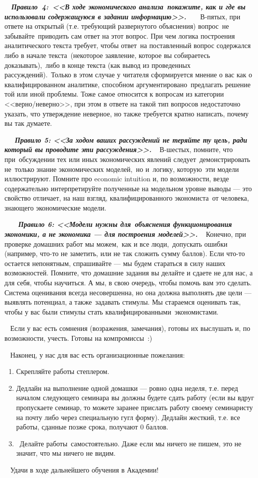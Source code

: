 \documentclass[a4paper,12pt]{article}
\theoremstyle{plain} %
\theoremstyle{definition} %
\theoremstyle{remark} %
\begin{document}
  \textbf{\textit{Правило 4: <<В ходе экономического анализа покажите, как и где вы использовали содержащуюся в задании информацию>>.
}} 
 
 
В-пятых, при ответе на открытый (т.е. требующий развернутого объяснения) вопрос не забывайте приводить сам ответ на этот вопрос. При чем логика построения аналитического текста требует, чтобы ответ на поставленный вопрос содержался либо в начале текста (некоторое заявление, которое вы собираетесь доказывать), либо в конце текста (как вывод из проведенных рассуждений). Только в этом случае у читателя сформируется мнение о вас как о квалифицированном аналитике, способном аргументировано предлагать решение той или иной проблемы. Тоже самое относится к вопросам из категории <<верно/неверно>>, при этом в ответе на такой тип вопросов недостаточно указать, что утверждение неверное, но также требуется кратно написать, почему вы так думаете.

   \textbf{\textit{Правило 5: <<За ходом ваших рассуждений не теряйте ту цель, ради который вы проводите эти рассуждения>>.
}}
 
В-шестых, помните, что при обсуждении тех или иных экономических явлений следует демонстрировать не только знание экономических моделей, но и логику, которую эти модели иллюстрируют. Помните про economic intuition и, по возможности, везде содержательно интерпретируйте полученные на модельном уровне выводы --- это свойство отличает, на наш взгляд, квалифицированного экономиста от человека, знающего экономические модели.   

    \textbf{\textit{Правило 6: <<Модели нужны для объяснения функционирования экономики, а не экономика --- для построения моделей>>. 
}}
 
Конечно, при проверке домашних работ мы можем, как и все люди, допускать ошибки (например, что-то не заметить, или не так сложить сумму баллов). Если что-то остается непонятным, спрашивайте --- мы будем стараться в силу наших возможностей. Помните, что домашние задания вы делайте и сдаете не для нас, а для себя, чтобы научиться. А мы, в свою очередь, чтобы помочь вам это сделать. Система оценивания всегда несовершенна, но она должна выполнять две цели --- выявлять потенциал, а также задавать стимулы. Мы стараемся оценивать так, чтобы у вас были стимулы стать квалифицированными экономистами.

 
Если у вас есть сомнения (возражения, замечания), готовы их выслушать и, по возможности, учесть. Готовы на компромиссы :)

 
Наконец, у нас для вас есть организационные пожелания:

\begin{enumerate}
	\item Скрепляйте работы степлером. 
\item Дедлайн на выполнение одной домашки --- ровно одна неделя, т.е. перед началом следующего семинара вы должны будете сдать работу (если вы вдруг пропускаете семинар, то можете заранее прислать работу своему семинаристу на почту либо через специальную гугл форму). Дедлайн жесткий, т.е. все работы, сданные позже срока, получают $0$ баллов. 
\item  Делайте работы самостоятельно. Даже если мы ничего не пишем, это не значит, что мы ничего не видим.
\end{enumerate}


 
Удачи в ходе дальнейшего обучения в Академии!  

       
\end{document}
